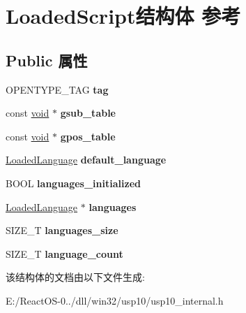 \hypertarget{struct_loaded_script}{}\section{Loaded\+Script结构体 参考}
\label{struct_loaded_script}
\subsection*{Public 属性}
\begin{DoxyCompactItemize}
\item 
\mbox{\label{struct_loaded_script_a2426a773faf45b34a2d82a1c57945544}} 
O\+P\+E\+N\+T\+Y\+P\+E\+\_\+\+T\+AG {\bfseries tag}
\item 
\mbox{\label{struct_loaded_script_a2e81b42e8c2d8a96e2ead152af6031db}} 
const \hyperlink{interfacevoid}{void} $\ast$ {\bfseries gsub\+\_\+table}
\item 
\mbox{\label{struct_loaded_script_ad9b9f71bb08529bf58b560b10e4bd47c}} 
const \hyperlink{interfacevoid}{void} $\ast$ {\bfseries gpos\+\_\+table}
\item 
\mbox{\label{struct_loaded_script_aeadca4078f66ec1e81ed8ab935cad8ca}} 
\hyperlink{struct_loaded_language}{Loaded\+Language} {\bfseries default\+\_\+language}
\item 
\mbox{\label{struct_loaded_script_aa6f8e3929b0e14e8e4214671d2b0a88f}} 
B\+O\+OL {\bfseries languages\+\_\+initialized}
\item 
\mbox{\label{struct_loaded_script_a506923209d9d68c18f01de9686966868}} 
\hyperlink{struct_loaded_language}{Loaded\+Language} $\ast$ {\bfseries languages}
\item 
\mbox{\label{struct_loaded_script_afc96f238679ce9e83d514780581a608d}} 
S\+I\+Z\+E\+\_\+T {\bfseries languages\+\_\+size}
\item 
\mbox{\label{struct_loaded_script_a7d050b000b7d713205faa5c940a3e11c}} 
S\+I\+Z\+E\+\_\+T {\bfseries language\+\_\+count}
\end{DoxyCompactItemize}


该结构体的文档由以下文件生成\+:\begin{DoxyCompactItemize}
\item 
E\+:/\+React\+O\+S-\/0../dll/win32/usp10/usp10\+\_\+internal.\+h\end{DoxyCompactItemize}
